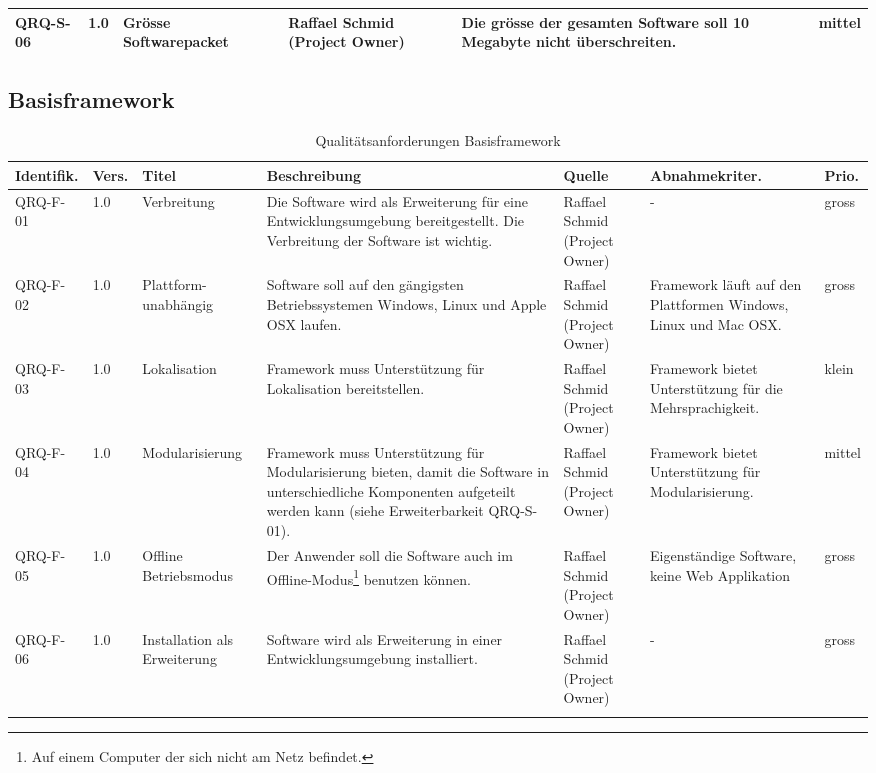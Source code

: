 \begin{landscape}
\begin{longtable}{|p{1.6cm}|p{0.7cm}|p{2.5cm}|p{4.5cm}|p{2.6cm}|p{4cm}|p{0.9cm}|}
QRQ-S-06 & 1.0 & Grösse Softwarepacket & & Raffael Schmid (Project Owner) & Die grösse der gesamten Software soll 10 Megabyte nicht überschreiten. & mittel\\\hline

\end{longtable}
\subsection{Basisframework}\label{anforderungen_framework}
\begin{longtable}{|p{1.6cm}|p{0.7cm}|p{2.5cm}|p{4.5cm}|p{2.6cm}|p{4cm}|p{0.9cm}|}
    \hline\textbf{Identifik.} & \textbf{Vers.}& \textbf{Titel} & \textbf{Beschreibung} & \textbf{Quelle} & \textbf{Abnahmekriter.} & \textbf{Prio.}\\\hline
   QRQ-F-01 & 1.0 & Verbreitung & Die Software wird als Erweiterung für eine Entwicklungsumgebung bereitgestellt. Die Verbreitung der Software ist wichtig. & Raffael Schmid (Project Owner) & - & gross \\\hline

   QRQ-F-02 & 1.0 & Plattform-unabhängig & Software soll auf den gängigsten Betriebssystemen Windows, Linux und Apple OSX laufen. & Raffael Schmid (Project Owner) &  Framework läuft auf den Plattformen Windows, Linux und Mac OSX. & gross \\\hline

   QRQ-F-03 & 1.0 & Lokalisation & Framework muss Unterstützung für Lokalisation bereitstellen.& Raffael Schmid (Project Owner) & Framework bietet Unterstützung für die Mehrsprachigkeit. &klein \\\hline

   QRQ-F-04 & 1.0 & Modularisierung & Framework muss Unterstützung für Modularisierung bieten, damit die Software in unterschiedliche Komponenten aufgeteilt werden kann (siehe Erweiterbarkeit QRQ-S-01). & Raffael Schmid (Project Owner) & Framework bietet Unterstützung für Modularisierung.&mittel \\\hline

   QRQ-F-05 & 1.0 & Offline Betriebsmodus & Der Anwender soll die Software auch im Offline-Modus\footnote{Auf einem Computer der sich nicht am Netz befindet.} benutzen können. & Raffael Schmid (Project Owner) & Eigenständige Software, keine Web Applikation & gross  \\\hline

   QRQ-F-06 & 1.0 & Installation als Erweiterung& Software wird als Erweiterung in einer Entwicklungsumgebung installiert. & Raffael Schmid (Project Owner) & - & gross  \\\hline
    \caption{Qualitätsanforderungen Basisframework}
\end{longtable}
\end{landscape}
